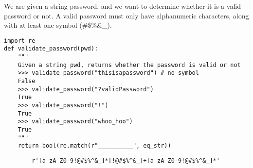 \begin{blocksection}
\question We are given a string password, and we want to determine whether it is a valid password or not. A valid password must only have alphanumeric characters, along with at least one symbol (\?\#\$\%\^\&\*\!\_).

\begin{lstlisting}
import re
def validate_password(pwd):
    """
    Given a string pwd, returns whether the password is valid or not
    >>> validate_password("thisisapassword") # no symbol
    False
    >>> validate_password("?validPassword")
    True
    >>> validate_password("!")
    True
    >>> validate_password("whoo_hoo")
    True
    """
    return bool(re.match(r"__________", eq_str))
\end{lstlisting}

\begin{solution}[2in]
    \begin{lstlisting}
        r'[a-zA-Z0-9!@#$%^&_]*[!@#$%^&_]+[a-zA-Z0-9!@#$%^&_]*'
    \end{lstlisting}
\end{solution}
\end{blocksection}
